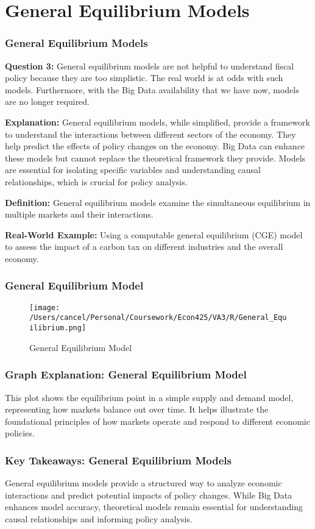 \documentclass{beamer}
\begin{document}
\section{General Equilibrium Models}
\begin{frame}
    \frametitle{General Equilibrium Models}
    \textbf{Question 3:} General equilibrium models are not helpful to understand fiscal policy because they are too simplistic. The real world is at odds with such models. Furthermore, with the Big Data availability that we have now, models are no longer required.

    \textbf{Explanation:} General equilibrium models, while simplified, provide a framework to understand the interactions between different sectors of the economy. They help predict the effects of policy changes on the economy. Big Data can enhance these models but cannot replace the theoretical framework they provide. Models are essential for isolating specific variables and understanding causal relationships, which is crucial for policy analysis.

    \textbf{Definition:} General equilibrium models examine the simultaneous equilibrium in multiple markets and their interactions.

    \textbf{Real-World Example:} Using a computable general equilibrium (CGE) model to assess the impact of a carbon tax on different industries and the overall economy.
\end{frame}

\begin{frame}
    \frametitle{General Equilibrium Model}
    \begin{figure}[h!]
        \centering
        \texttt{[image: /Users/cancel/Personal/Coursework/Econ425/VA3/R/General\_Equilibrium.png]}
        \caption{General Equilibrium Model}
    \end{figure}
\end{frame}

\begin{frame}
    \frametitle{Graph Explanation: General Equilibrium Model}
    This plot shows the equilibrium point in a simple supply and demand model, representing how markets balance out over time. It helps illustrate the foundational principles of how markets operate and respond to different economic policies.
\end{frame}

\begin{frame}
    \frametitle{Key Takeaways: General Equilibrium Models}
    General equilibrium models provide a structured way to analyze economic interactions and predict potential impacts of policy changes. While Big Data enhances model accuracy, theoretical models remain essential for understanding causal relationships and informing policy analysis.
\end{frame}
\end{document}
